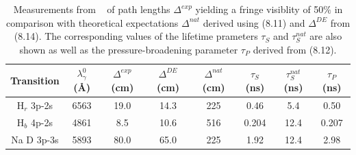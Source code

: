 \documentclass [12pt]{article}
\begin{document}
{   \begin{table}
   \begin{center}
   \begin{tabular}{|c|c c c c c c c|} \hline  
      Transition   & $\lambda_{\gamma}^0$ (\AA)  & $\Delta^{exp}$ (cm)  &  $\Delta^{DE}$ (cm) & $\Delta^{nat}$ (cm) 
    & $\tau_S$ (ns) & $\tau_S^{nat}$ (ns) &  $\tau_P$ (ns)  \\
   \hline 
     H$_r$ 3p-2s & 6563 & 19.0 & 14.3 & 225 & 0.46 & 5.4  & 0.50 \\
    H$_b$ 4p-2s & 4861 & 8.5 & 10.6 & 516 & 0.204 & 12.4 & 0.207 \\
    Na D 3p-3s & 5893 & 80.0 & 65.0 & 225 & 1.92 & 12.4 &  2.98 \\
  \hline
  \end{tabular}
   \caption[] { Measurements from ~\cite{Michelson1} of path lengths $\Delta^{exp}$ yielding a fringe 
    visiblity of 50$\%$ in comparison with theoretical expectations $\Delta^{nat}$ derived using
    (8.11) and $\Delta^{DE}$ from (8.14). The corresponding values of the lifetime
     prameters $\tau_S$ and $\tau_S^{nat}$ are
     also shown as well as the pressure-broadening parameter $\tau_P$ derived from (8.12).} 
  \end{center}
  \end{table} 

}
\end{document}

